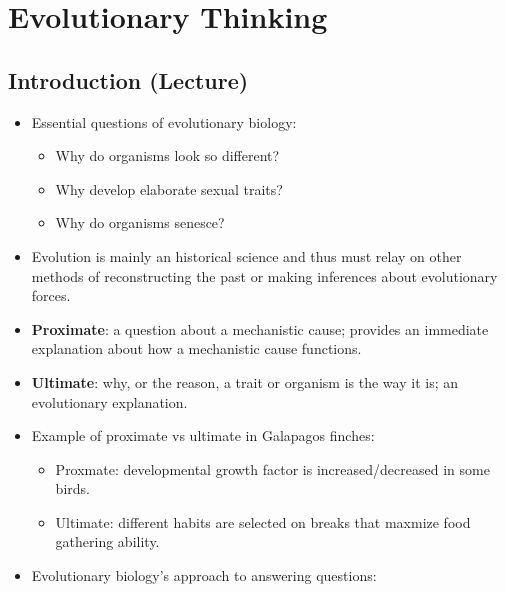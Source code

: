 \documentclass[12pt,a4paper]{article}
\begin{document}
\tableofcontents
\cleardoublepage
\fancyhead{}

\clearpage
{}
\clearpage
\section{Evolutionary Thinking}
\subsection{Introduction (Lecture)}
\begin{itemize}
    \item Essential questions of evolutionary biology: 
        \begin{itemize}
            \item Why do organisms look so different?
            \item Why develop elaborate sexual traits?
            \item Why do organisms senesce?
        \end{itemize}
    \item Evolution is mainly an historical science and thus must relay on other methods of reconstructing the past or making inferences about evolutionary forces. 
    \item \textbf{Proximate}: a question about a mechanistic cause; provides an immediate explanation about {\color{o-Sun}how} a mechanistic cause functions.
    \item \textbf{Ultimate}: {\color{o-Sun}why}, or the reason, a trait or organism is the way it is; an evolutionary explanation.
    \item Example of proximate vs ultimate in Galapagos finches: 
        \begin{itemize}
            \item Proxmate: developmental growth factor is increased/decreased in some birds.
            \item Ultimate: different habits are selected on breaks that maxmize food gathering ability.
        \end{itemize}
    \item Evolutionary biology's approach to answering questions:
        \begin{itemize}

\end{itemize}
\end{itemize}
\end{document}

